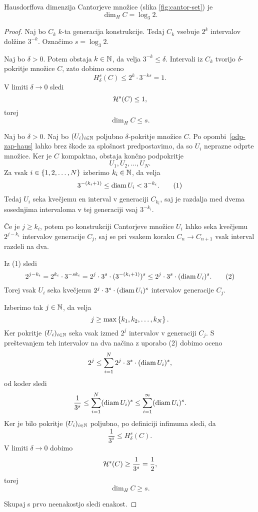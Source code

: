 \begin{trditev}
    Hausdorffova dimenzija Cantorjeve množice (slika \ref{fig:cantor-set}) je
    \[\dim_H C = \log_3 2.\]
\end{trditev}

\begin{proof}    
    Naj bo \(C_k\) \(k\)-ta generacija konstrukcije. Tedaj \(C_k\) vsebuje \(2^k\) intervalov dolžine \(3^{-k}\). Označimo \(s = \log_3 2\).

    Naj bo \(\delta > 0\). Potem obstaja \(k \in \mathbb{N}\), da velja \(3^{-k} \leq \delta\). Intervali iz \(C_k\) tvorijo \(\delta\)-pokritje množice \(C\), zato dobimo oceno
    \[H^s_\delta(C) \leq 2^k \cdot 3^{-ks} = 1.\]
    V limiti \(\delta \to 0\) sledi
    \[\mathcal{H}^s(C) \leq 1,\]
    torej 
    \[\dim_H C \leq s.\]

    Naj bo \(\delta > 0\). Naj bo \((U_i)_{i \in \mathbb{N}}\) poljubno \(\delta\)-pokritje množice \(C\). Po opombi~\ref{odp-zap-haus} lahko brez škode za splošnost predpostavimo, da so \(U_i\) neprazne odprte množice. Ker je \(C\) kompaktna, obstaja končno podpokritje 
    \[U_1, U_2, \ldots, U_N.\]
    Za vsak \(i \in \left\{1, 2, \ldots, N\right\}\) izberimo \(k_i \in \mathbb{N}\), da velja
    \[3^{-(k_i + 1)} \leq \operatorname{diam} U_i < 3^{-k_i}. \tag{1}\]
    Tedaj \(U_i\) seka kvečjemu en interval v generaciji \(C_{k_i}\), saj je razdalja med dvema sosednjima intervaloma v tej generaciji vsaj \(3^{-k_i}\).

    Če je \(j \geq k_i\), potem po konstrukciji Cantorjeve množice \(U_i\) lahko seka kvečjemu \(2^{j - k_i}\) intervalov generacije \(C_j\), saj se pri vsakem koraku \(C_n \to C_{n+1}\) vsak interval razdeli na dva.

    Iz (1) sledi
    \[2^{j - k_i} = 2^{k_i} \cdot 3^{-sk_i} = 2^j \cdot 3^s \cdot (3^{-(k_i+1)})^s \leq 2^j \cdot 3^s \cdot (\operatorname{diam} U_i)^s. \tag{2}\]
    Torej vsak \(U_i\) seka kvečjemu \(2^j \cdot 3^s \cdot (\operatorname{diam} U_i)^s\) intervalov generacije \(C_j\).

    Izberimo tak \(j \in \mathbb{N}\), da velja
    \[
    j \geq \max \left\{k_1, k_2, \ldots, k_N\right\}.
    \]
    Ker pokritje \((U_i)_{i \in \mathbb{N}}\) seka vsak izmed \(2^j\) intervalov v generaciji \(C_j\). S preštevanjem teh intervalov na dva načina z uporabo (2) dobimo oceno
    \[2^j \leq \sum_{i=1}^{N} 2^j \cdot 3^s \cdot (\operatorname{diam} U_i)^s,\]
    od koder sledi
    \[\frac{1}{3^s} \leq \sum_{i=1}^{N} (\operatorname{diam} U_i)^s \leq \sum_{i=1}^{\infty} (\operatorname{diam} U_i)^s.\]
    Ker je bilo pokritje \((U_i)_{i \in \mathbb{N}}\) poljubno, po definiciji infimuma sledi, da 
    \[\frac{1}{3^s} \leq H^s_\delta(C).\]
    V limiti \(\delta \to 0\) dobimo
    \[\mathcal{H}^s(C) \geq \frac{1}{3^s} = \frac{1}{2},\]
    torej 
    \[\dim_H C \geq s.\]

    Skupaj s prvo neenakostjo sledi enakost.
\end{proof}

